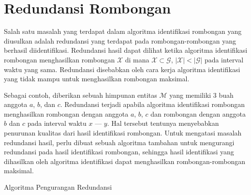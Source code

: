 \section{Redundansi Rombongan}
\label{sec:redundancy}

Salah satu masalah yang terdapat dalam algoritma identifikasi rombongan yang diusulkan adalah redundansi yang terdapat pada rombongan-rombongan yang berhasil diidentifikasi. Redundansi hasil dapat dilihat ketika algoritma identifikasi rombongan menghasilkan rombongan $\mathcal{X}$ di mana $\mathcal{X} \subset \mathcal{G}$, $|\mathcal{X}| < |\mathcal{G}|$ pada interval waktu yang sama. Redundansi disebabkan oleh cara kerja algoritma identifikasi yang tidak mampu untuk menghasilkan rombongan maksimal.

Sebagai contoh, diberikan sebuah himpunan entitas $\mathcal{M}$ yang memiliki 3 buah anggota $a$, $b$, dan $c$. Redundansi terjadi apabila algoritma identifikasi rombongan menghasilkan rombongan dengan anggota $a$, $b$, $c$ dan rombongan dengan anggota $b$ dan $c$ pada interval waktu $x$ --- $y$. Hal tersebut tentunya menyebabkan penurunan kualitas dari hasil identifikasi rombongan. Untuk mengatasi masalah redundansi hasil, perlu dibuat sebuah algoritma tambahan untuk mengurangi redundansi pada hasil identifikasi rombongan, sehingga hasil identifikasi yang dihasilkan oleh algoritma identifikasi dapat menghasilkan rombongan-rombongan maksimal.

\begin{algorithm}[h]
    \caption{Algoritma Pengurangan Redundansi}
    \DontPrintSemicolon
    
    \label{bab3:redundansi}
    
 
  
    
\end{algorithm}

